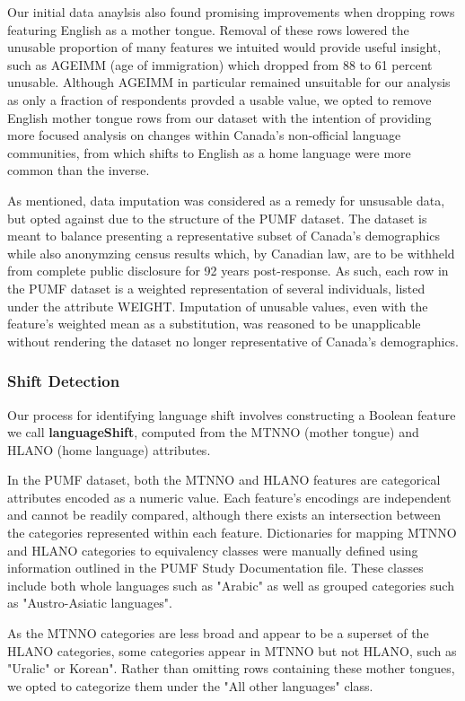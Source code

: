 \documentclass[10pt, conference, compsocconf]{IEEEtran}
\begin{document}
Our initial data anaylsis also found promising improvements when dropping rows featuring English as a mother tongue.  Removal of these rows lowered the unusable proportion of many features we intuited would provide useful insight, such as AGEIMM (age of immigration) which dropped from 88 to 61 percent unusable.  Although AGEIMM in particular remained unsuitable for our analysis as only a fraction of respondents provded a usable value, we opted to remove English mother tongue rows from our dataset with the intention of providing more focused analysis on changes within Canada's non-official language communities, from which shifts to English as a home language were more common than the inverse.

As mentioned, data imputation was considered as a remedy for unsusable data, but opted against due to the structure of the PUMF dataset.  The dataset is meant to balance presenting a representative subset of Canada's demographics while also anonymzing census results which, by Canadian law, are to be withheld from complete public disclosure for 92 years post-response.  As such, each row in the PUMF dataset is a weighted representation of several individuals, listed under the attribute WEIGHT.  Imputation of unusable values, even with the feature's weighted mean as a substitution, was reasoned to be unapplicable without rendering the dataset no longer representative of Canada's demographics.

\subsubsection{Shift Detection}
Our process for identifying language shift involves constructing a Boolean feature we call \textbf{languageShift}, computed from the MTNNO (mother tongue) and HLANO (home language) attributes.

In the PUMF dataset, both the MTNNO and HLANO features are categorical attributes encoded as a numeric value.  Each feature's encodings are independent and cannot be readily compared, although there exists an intersection between the categories represented within each feature.  Dictionaries for mapping MTNNO and HLANO categories to equivalency classes were manually defined using information outlined in the PUMF Study Documentation file.  These classes include both whole languages such as "Arabic" as well as grouped categories such as "Austro-Asiatic languages".

As the MTNNO categories are less broad and appear to be a superset of the HLANO categories, some categories appear in MTNNO but not HLANO, such as "Uralic" or Korean".  Rather than omitting rows containing these mother tongues, we opted to categorize them under the "All other languages" class.
\end{document}
